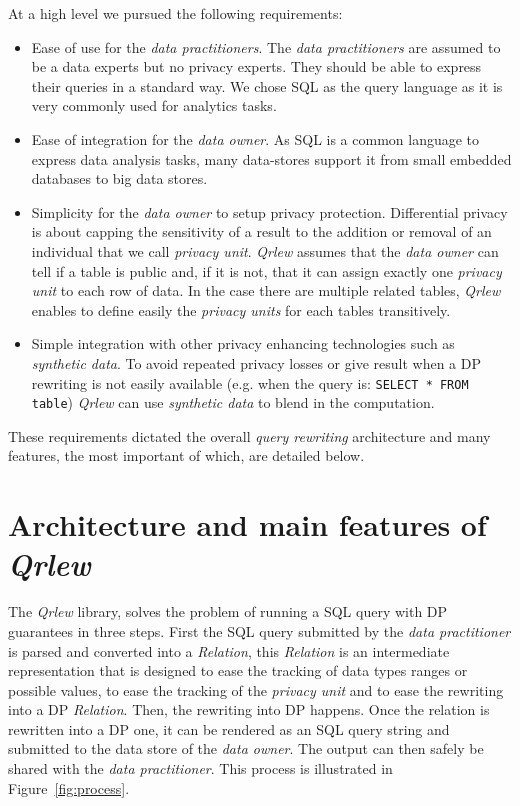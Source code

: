 \documentclass[letterpaper]{article} %
\newcommand{\qrlew}{\emph{Qrlew}}
\begin{document}
At a high level we pursued the following requirements:
\begin{itemize}
    \item Ease of use for the \emph{data practitioners}. The \emph{data practitioners} are assumed to be a data experts but no privacy experts. They should be able to express their queries in a standard way. We chose SQL as the query language as it is very commonly used for analytics tasks.
    \item Ease of integration for the \emph{data owner}. As SQL is a common language to express data analysis tasks, many data-stores support it from small embedded databases to big data stores.
    \item Simplicity for the \emph{data owner} to setup privacy protection. Differential privacy is about capping the sensitivity of a result to the addition or removal of an individual that we call \emph{privacy unit}. \qrlew{} assumes that the \emph{data owner} can tell if a table is public and, if it is not, that it can assign exactly one \emph{privacy unit} to each row of data. In the case there are multiple related tables, \qrlew{} enables to define easily the \emph{privacy units} for each tables transitively.
    \item Simple integration with other privacy enhancing technologies such as \emph{synthetic data}. To avoid repeated privacy losses or give result when a DP rewriting is not easily available (e.g. when the query is: \texttt{SELECT * FROM table}) \qrlew{} can use \emph{synthetic data} to blend in the computation.
\end{itemize}

These requirements dictated the overall \emph{query rewriting} architecture and many features, the most important of which, are detailed below.

\section{Architecture and main features of \qrlew}

The \qrlew{} library, solves the problem of running a SQL query with DP guarantees in three steps. First the SQL query submitted by the \emph{data practitioner} is parsed and converted into a \emph{Relation}, this \emph{Relation} is an intermediate representation that is designed to ease the tracking of data types ranges or possible values, to ease the tracking of the \emph{privacy unit} and to ease the rewriting into a DP \emph{Relation}. Then, the rewriting into DP happens. Once the relation is rewritten into a DP one, it can be rendered as an SQL query string and submitted to the data store of the \emph{data owner}. The output can then safely be shared with the \emph{data practitioner}. This process is illustrated in Figure~\ref{fig:process}.
\end{document}
